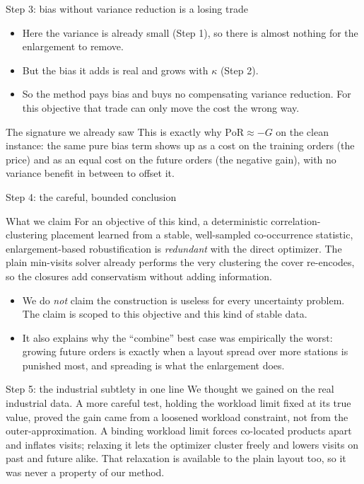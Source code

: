 \documentclass[11pt,aspectratio=169]{beamer}
\newcommand{\bd}[1]{\textcolor{bad}{#1}}
\begin{document}
\begin{frame}{Step 3: bias without variance reduction is a losing trade}
  \begin{itemize}
    \item Here the variance is already small (Step 1), so there is almost nothing for the enlargement to remove.
    \item But the bias it adds is real and grows with $\kappa$ (Step 2).
    \item So the method pays bias and buys no compensating variance reduction. For this objective that trade can only move the cost the wrong way.
  \end{itemize}
  \begin{alertblock}{The signature we already saw}
  This is exactly why $\mathrm{PoR}\approx -G$ on the clean instance: the same pure bias term shows up as a cost on the training orders (the price) and as an equal cost on the future orders (the negative gain), with no variance benefit in between to offset it.
  \end{alertblock}
\end{frame}

\begin{frame}{Step 4: the careful, bounded conclusion}
  \begin{block}{What we claim}
  For an objective of this kind, a deterministic correlation-clustering placement learned from a stable, well-sampled co-occurrence statistic, enlargement-based robustification is \emph{redundant} with the direct optimizer. The plain min-visits solver already performs the very clustering the cover re-encodes, so the closures add conservatism without adding information.
  \end{block}
  \begin{itemize}
    \item We do \emph{not} claim the construction is useless for every uncertainty problem. The claim is scoped to this objective and this kind of stable data.
    \item It also explains why the ``combine'' best case was empirically the worst: growing future orders is exactly when a layout spread over more stations is punished most, and spreading is what the enlargement does.
  \end{itemize}
\end{frame}

\begin{frame}{Step 5: the industrial subtlety in one line}
  We thought we gained on the real industrial data. A more careful test, holding the workload limit fixed at its true value, proved the gain came from a \bd{loosened workload constraint}, not from the outer-approximation. A binding workload limit forces co-located products apart and inflates visits; relaxing it lets the optimizer cluster freely and lowers visits on past and future alike. That relaxation is available to the plain layout too, so it was never a property of our method.
\end{frame}
\end{document}
